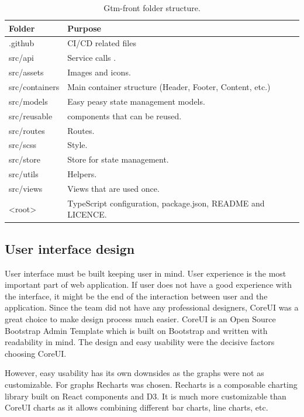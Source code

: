 \begin{table}[h]
    \centering
    \begin{tabular}{ | p{3cm} | p{10cm} |}
        \hline
        Folder & Purpose\\
        \hline
        .github & CI/CD related files\\
        \hline
        src/api & Service calls .\\
        \hline
        src/assets & Images and icons. \\
        \hline
        src/containers & Main container structure (Header, Footer, Content, etc.)\\
        \hline
        src/models & Easy peasy state management models.\\
        \hline
        src/reusable & components that can be reused.\\
        \hline
        src/routes & Routes.\\
        \hline
        src/scss & Style.\\
        \hline
        src/store & Store for state management.\\
        \hline
        src/utils & Helpers.\\
        \hline
        src/views & Views that are used once.\\
        \hline
        <root> & TypeScript configuration, package.json, README and LICENCE.\\
        \hline
    \end{tabular}
    \caption{Gtm-front folder structure.}
    \label{tab:gtm-front-folder-structure}
\end{table}

\subsection{User interface design}\label{subsec:user-interface-design}
User interface must be built keeping user in mind.
User experience is the most important part of web application.
If user does not have a good experience with the interface, it might be the end of the interaction between user and the application.
Since the team did not have any professional designers, CoreUI was a great choice to make design process much easier.
CoreUI is an Open Source Bootstrap Admin Template which is built on Bootstrap and written with readability in mind.
The design and easy usability were the decisive factors choosing CoreUI.

However, easy usability has its own downsides as the graphs were not as customizable.
For graphs Recharts was chosen.
Recharts is a composable charting library built on React components and D3.
It is much more customizable than CoreUI charts as it allows combining different bar charts, line charts, etc.
\cite{recharts-readme}

